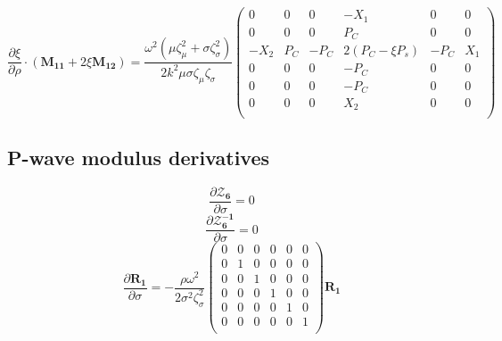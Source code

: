 \documentclass[a4paper,10pt]{article}
\begin{document}
\begin{equation}
\frac{\partial \xi}{\partial\rho}\cdot\left(\mathbf{M_{11}}+2\xi\mathbf{M_{12}}\right)=\frac{\omega ^2 \left(\mu  \zeta _{\mu }^2+\sigma  \zeta _{\sigma }^2\right)}{2 k^2 \mu  \sigma  \zeta _{\mu }
   \zeta _{\sigma }}\left(
\begin{array}{cccccc}
 0 & 0 & 0 & -X_1 & 0 & 0 \\
 0 & 0 & 0 & P_C & 0 & 0 \\
 -X_2 & P_C & -P_C & 2 \left(P_C-\xi  P_s\right) & -P_C & X_1 \\
 0 & 0 & 0 & -P_C & 0 & 0 \\
 0 & 0 & 0 & -P_C & 0 & 0 \\
 0 & 0 & 0 & X_2 & 0 & 0 \\
\end{array}
\right)
\end{equation}
\subsection{P-wave modulus derivatives}
\begin{equation}
\frac{\partial \boldsymbol{\mathcal{Z}_6}}{\partial \sigma} = 0
\end{equation}
\begin{equation}
\frac{\partial \boldsymbol{\mathcal{Z}_6^{-1}}}{\partial \sigma} = 0
\end{equation}
\begin{equation}
\frac{\partial \mathbf{R_1}}{\partial \sigma} =-\frac{\rho\omega^2}{2\sigma^2 \zeta_\sigma^2} \left(
\begin{array}{cccccc}
 0 & 0 & 0 & 0 & 0 & 0 \\
 0 & 1 & 0 & 0 & 0 & 0 \\
 0 & 0 & 1 & 0 & 0 & 0 \\
 0 & 0 & 0 & 1 & 0 & 0 \\
 0 & 0 & 0 & 0 & 1 & 0 \\
 0 & 0 & 0 & 0 & 0 & 1 \\
\end{array}
\right)\mathbf{R_1}
\end{equation}
\end{document}
